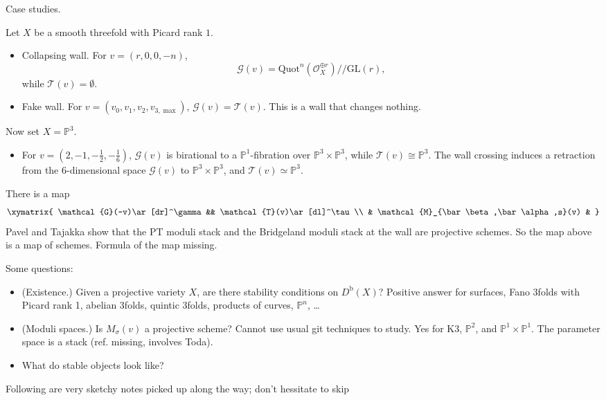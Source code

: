 \documentclass{book}
\begin{document}
\medskip\noindent
Case studies.

\noindent
Let $X$ be a smooth threefold with
Picard rank $1$.
\begin{itemize}
\item Collapsing wall.
For
$v=(r,0,0,-n)$,
$$
\mathcal{G}(v)=
\mathrm{Quot}^n(
\mathcal{O}_X^{\oplus r})/\!/
\mathrm{GL}(r),
$$
while $\mathcal{T}(v)=\emptyset$.
\item Fake wall.
For $v=(v_0,v_1,v_2,v_{3,\max})$,
$\mathcal{G}(v)=\mathcal{T}(v)$.
This is a wall that changes nothing.
\end{itemize}

\noindent
Now set $X=\mathbb{P}^3$.
\begin{itemize}
\item For
$v=(2,-1,-\tfrac{1}{2},-\tfrac{1}{6})$,
$\mathcal{G}(v)$ is birational to a
$\mathbb{P}^1$-fibration over
$\mathbb{P}^3\times\mathbb{P}^3$,
while $\mathcal{T}(v)\cong\mathbb{P}^3$.
The wall crossing induces a
retraction from the $6$-dimensional
space $\mathcal{G}(v)$ to
$\mathbb{P}^3\times\mathbb{P}^3$,
and
$\mathcal{T}(v)\simeq \mathbb{P}^3$.
\end{itemize}

\medskip\noindent
There is a map
$$
\xymatrix{
\mathcal{G}(-v)\ar[dr]^\gamma
&&
\mathcal{T}(v)\ar[dl]^\tau
\\
&
\mathcal{M}_{\bar\beta,\bar\alpha,s}(v)
&
}
$$
Pavel and Tajakka show that
the PT moduli stack and the
Bridgeland moduli stack at the wall
are projective schemes.
So the map above is a map of
schemes.
\noindent
Formula of the map missing.

\medskip\noindent
Some questions:
\begin{itemize}
\item (Existence.) Given a projective
variety $X$, are there stability
conditions on $D^\text{b}(X)$?
Positive answer for surfaces,
Fano 3folds with Picard rank 1,
abelian 3folds, quintic 3folds,
products of curves, $\mathbb{P}^n$,
\dots
\item (Moduli spaces.) Is
$M_\sigma(v)$ a projective scheme?
Cannot use usual git techniques to
study. Yes for K3, $\mathbb{P}^2$,
and $\mathbb{P}^1\times \mathbb{P}^1$.
The parameter space is a stack
(ref. missing, involves Toda).
\item What do stable objects
look like?
\end{itemize}

\medskip\noindent
\medskip\noindent
Following are very sketchy notes picked
up along the way; don't hessitate to skip
\end{document}
